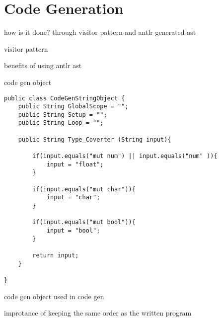 \section{Code Generation}

how is it done? through visitor pattern and antlr generated ast


visitor pattern

benefits of using antlr ast

code gen object


\begin{listing}[htb!]
    \begin{verbatim}
public class CodeGenStringObject {
    public String GlobalScope = "";
    public String Setup = "";
    public String Loop = "";

    public String Type_Coverter (String input){
        
        if(input.equals("mut num") || input.equals("num" )){
            input = "float";
        }

        if(input.equals("mut char")){
            input = "char";
        }

        if(input.equals("mut bool")){
            input = "bool";
        }

        return input;
    }

}
    \end{verbatim}
    \caption{code gen object used in code gen}
    \label{lst:code gen object}
\end{listing}


improtance of keeping the same order as the written program

